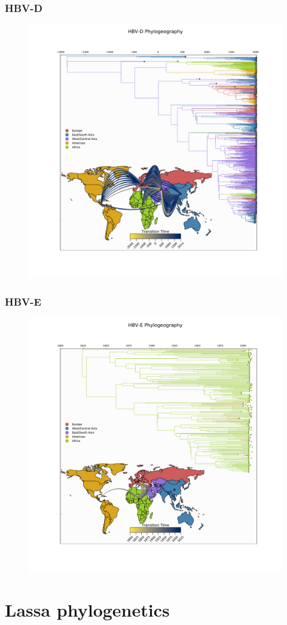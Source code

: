 \documentclass{beamer}
\begin{document}
\begin{frame}
  \frametitle{HBV-D}
  \begin{figure}
    \includegraphics[width=.6\linewidth]{image/results/HBV-D_phylogeography_and_mcc_tree}
  \end{figure}
\end{frame}


\begin{frame}
  \frametitle{HBV-E}
  \begin{figure}
    \includegraphics[width=.6\linewidth]{image/results/HBV-E_phylogeography_and_mcc_tree}
  \end{figure}
\end{frame}

\section{Lassa phylogenetics}
\end{document}
